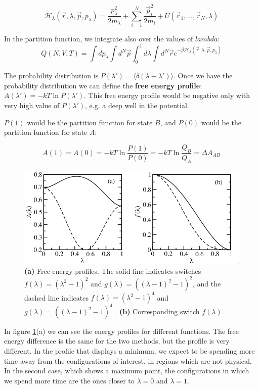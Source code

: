 	$$\mathcal{H}_\lambda(\vec{r}, \lambda, \vec{p}, p_\lambda) = \frac{p_\lambda^2}{2m_\lambda} + \sum\limits_{i=1}^N\frac{\vec{p}_i^2}{2m_i} + U(\vec{r}_1, \dots, \vec{r}_N, \lambda)$$

	In the partition function, we integrate also over the values of $lambda$:
	$$Q(N, V, T) = \int dp_\lambda\int d^N\vec{p}\int_0^1d\lambda\int d^N\vec{r}e^{-\beta\mathcal{H}_\lambda(\vec{r},\lambda,\vec{p}, p_\lambda)}$$

	The probability distribution is $P(\lambda') = \langle\delta(\lambda-\lambda')\rangle$. 
	Once we have the probability distribution we can define the \textbf{free energy profile}: $A(\lambda') = -kT\ln P(\lambda')$. 
	This free energy profile would be negative only with very high value of $P(\lambda ')$, e.g. a deep well in the potential.
	
	$P(1)$ would be the partition function for state $B$, and $P(0)$ would be the partition function for state $A$:

	$$A(1) = A(0) = -kT\ln\frac{P(1)}{P(0)} = -kT\ln\frac{Q_B}{Q_A} = \Delta A_{AB}$$


	\begin{figure}[H]
		\centering
		\includegraphics[scale = 0.5]{adiabatic-free-energy-dynamics}
		\caption{\textbf{(a)} Free energy profiles. The solid line indicates switches
$f(\lambda) = (\lambda^2 - 1)^2$ and $g(\lambda) = ((\lambda - 1)^2 - 1)^2$, and the dashed line indicates $f(\lambda) = (\lambda^2 - 1)^4$ and $g(\lambda) = ((\lambda - 1)^2 - 1)^4$ . \textbf{(b)} Corresponding switch $f(\lambda)$.}
		\label{fig:adiabatic-free-energy-dynamics}
	\end{figure}

	In figure \ref{fig:adiabatic-free-energy-dynamics}(a) we can see the energy profiles for different functions. 
	The free energy difference is the same for the two methods, but the profile is very different.
	In the profile that displays a minimum, we expect to be spending more time away from the configurations of interest, in regions which are not physical. 
	In the second case, which shows a maximum point, the configurations in which we spend more time are the ones closer to $\lambda = 0$ and $\lambda = 1$. 
	
